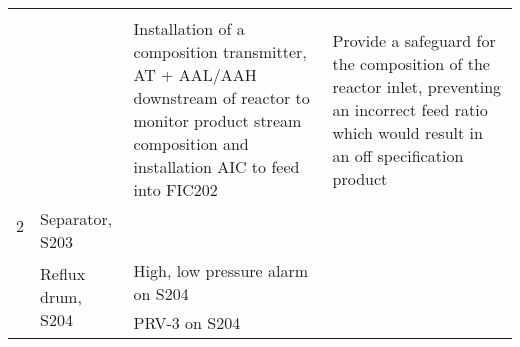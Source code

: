 \begin{table}[h]
\begin{tabular}{@{}llll@{}}
     &                                            &                                                                                                                                                               &                                                                                                                                                                                                                                                         \\ \cmidrule(l){3-4} 
     &                                            & Installation of a composition transmitter, AT + AAL/AAH downstream of reactor to monitor product stream composition and installation AIC to feed into FIC202  & Provide a safeguard for the composition of the reactor inlet, preventing an incorrect feed ratio which would result in an off specification product                                                   \\ \midrule
2    & \multirow{2}{*}{Separator, S203}           &                                                                                                                                                               &                                                                                                                                                                                                                                                         \\ \cmidrule(l){3-4} 
     &                                            &                                                                                                                                                               &                                                                                                                                                                                                                                                         \\ \cmidrule(l){2-4} 
     & \multirow{3}{*}{Reflux drum, S204}         & High, low pressure alarm on S204                                                                                                                              &                                                                                                                                                                                                                                                         \\ \cmidrule(l){3-4} 
     &                                            & PRV-3 on S204                                                                                                                                                 &                                                                                                                                                                                                                                                         \\ \cmidrule(l){3-4} 

\end{tabular}
\end{table}
